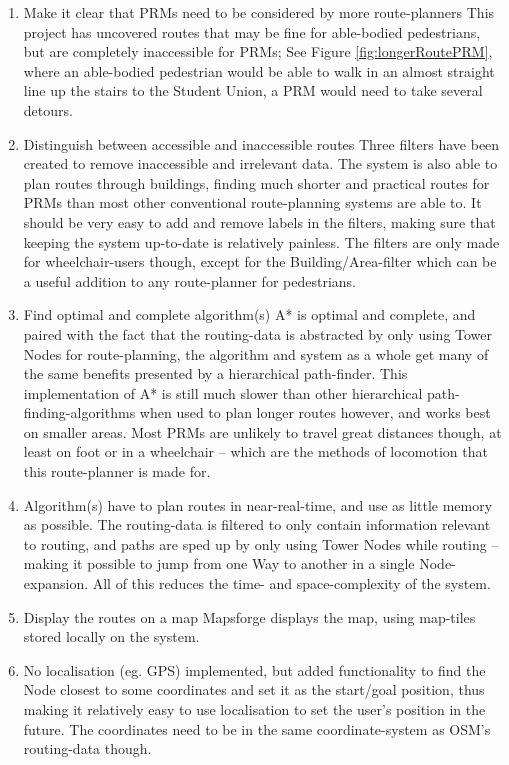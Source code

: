 \begin{enumerate}
	\item Make it clear that PRMs need to be considered by more route-planners
	\subitem This project has uncovered routes that may be fine for able-bodied pedestrians, but are completely inaccessible for PRMs; See Figure \ref{fig:longerRoutePRM}, where an able-bodied pedestrian would be able to walk in an almost straight line up the stairs to the Student Union, a PRM would need to take several detours.
	\item Distinguish between accessible and inaccessible routes
	\subitem Three filters have been created to remove inaccessible and irrelevant data. The system is also able to plan routes through buildings, finding much shorter and practical routes for PRMs than most other conventional route-planning systems are able to.
	\subitem It should be very easy to add and remove labels in the filters, making sure that keeping the system up-to-date is relatively painless. The filters are only made for wheelchair-users though, except for the Building/Area-filter which can be a useful addition to any route-planner for pedestrians.
	\item Find optimal and complete algorithm(s)
	\subitem A* is optimal and complete, and paired with the fact that the routing-data is abstracted by only using Tower Nodes for route-planning, the algorithm and system as a whole get many of the same benefits presented by a hierarchical path-finder.
	\subsubitem This implementation of A* is still much slower than other hierarchical path-finding-algorithms when used to plan longer routes however, and works best on smaller areas. Most PRMs are unlikely to travel great distances though, at least on foot or in a wheelchair -- which are the methods of locomotion that this route-planner is made for.
	\item Algorithm(s) have to plan routes in near-real-time, and use as little memory as possible.
	\subitem The routing-data is filtered to only contain information relevant to routing, and paths are sped up by only using Tower Nodes while routing -- making it possible to jump from one Way to another in a single Node-expansion. All of this reduces the time- and space-complexity of the system.
	\item Display the routes on a map
	\subitem Mapsforge\cite{Mapsforge,Mapsforge_map-tiles} displays the map, using map-tiles stored locally on the system.
	\item No localisation (eg. GPS) implemented, but added functionality to find the Node closest to some coordinates and set it as the start/goal position, thus making it relatively easy to use localisation to set the user's position in the future. The coordinates need to be in the same coordinate-system as OSM's routing-data though\cite{OSM_Convert-WGS84}.
\end{enumerate}